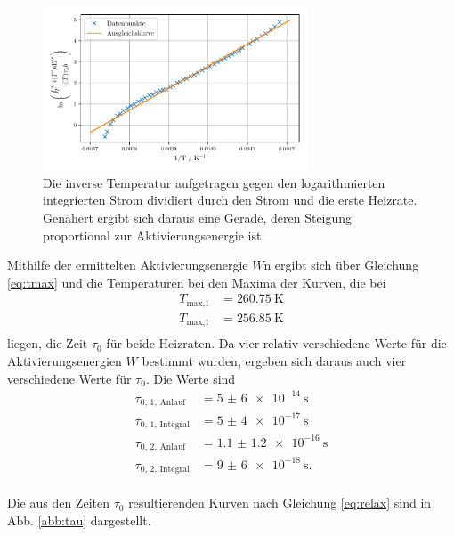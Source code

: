 \begin{figure}
    \centering
    \includegraphics[width=0.7\textwidth]{figures/integral2.pdf}
    \caption{Die inverse Temperatur aufgetragen gegen den logarithmierten integrierten Strom dividiert durch den Strom und die erste Heizrate. Genähert ergibt sich daraus eine Gerade, deren Steigung proportional zur Aktivierungsenergie ist.}
    \label{abb:integral2}
\end{figure}

Mithilfe der ermittelten Aktivierungsenergie $W$n ergibt sich über Gleichung \eqref{eq:tmax} und die Temperaturen bei den Maxima der Kurven, die bei 
\begin{align*}
    T_\text{max,1} &= \SI{260.75}{\kelvin} \\
    T_\text{max,1} &= \SI{256.85}{\kelvin} \\
\end{align*}
liegen, die Zeit $\tau_0$ für beide Heizraten. Da vier relativ verschiedene Werte für die Aktivierungsenergien $W$ bestimmt wurden, ergeben sich daraus auch vier verschiedene Werte für $\tau_0$.
Die Werte sind 
\begin{align*}
    \tau_\text{0, 1, Anlauf} &= \SI{5(6)e-14}{\second} \\
    \tau_\text{0, 1, Integral} &= \SI{5(4)e-17}{\second} \\
    \tau_\text{0, 2, Anlauf} &= \SI{1.1(12)e-16}{\second} \\
    \tau_\text{0, 2, Integral} &= \SI{9(6)e-18}{\second}. \\
\end{align*}

Die aus den Zeiten $\tau_0$ resultierenden Kurven nach Gleichung \eqref{eq:relax} sind in Abb. \ref{abb:tau} dargestellt.

